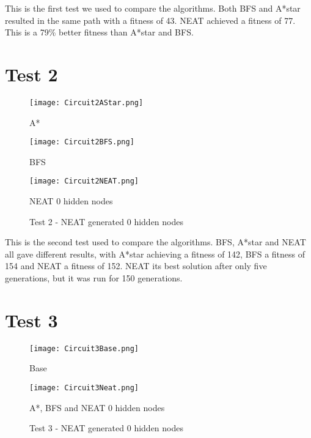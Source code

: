 \documentclass{kththesis}
\begin{document}
This is the first test we used to compare the algorithms. Both BFS and A*star resulted in the same path with a fitness of 43. NEAT achieved a fitness of 77. This is a 79\% better fitness than A*star and BFS.

\section{Test 2}

\begin{figure}[h]
{\centering

\begin{minipage}{0.3\textwidth}
\centering
\texttt{[image: Circuit2AStar.png]}
\caption{A*}
\end{minipage}\hfill
\begin{minipage}{0.3\textwidth}
\centering
\texttt{[image: Circuit2BFS.png]}
\caption{BFS}
\end{minipage}\hfill
\begin{minipage}{0.3\textwidth}
\centering
\texttt{[image: Circuit2NEAT.png]}
\caption{NEAT 0 hidden nodes}
\end{minipage}\hfill
\caption{Test 2 - NEAT generated 0 hidden nodes}
\label{Test 2}
}

\end{figure}

This is the second test used to compare the algorithms. BFS, A*star and NEAT all gave different results, with A*star achieving a fitness of 142, BFS a fitness of 154 and NEAT a fitness of 152. NEAT its best solution after only five generations, but it was run for 150 generations.


\section{Test 3}

\begin{figure}[h]
{\centering

\begin{minipage}{0.45\textwidth}
\centering
\texttt{[image: Circuit3Base.png]}
\caption{Base}
\end{minipage}\hfill
\begin{minipage}{0.45\textwidth}
\centering
\texttt{[image: Circuit3Neat.png]}
\caption{A*, BFS and NEAT 0 hidden nodes}
\end{minipage}\hfill
\caption{Test 3 - NEAT generated 0 hidden nodes}
\label{Test 3}
}

\end{figure}
\end{document}
